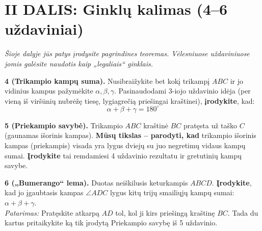 \documentclass[11pt,a4paper]{scrartcl}
\begin{document}
\newpage
\section*{II DALIS: Ginklų kalimas (4–6 uždaviniai)}
\textit{Šioje dalyje jūs patys įrodysite pagrindines teoremas. Vėlesniuose uždaviniuose jomis galėsite naudotis kaip „legaliais“ ginklais.}

\textbf{4 (Trikampio kampų suma).} Nusibraižykite bet kokį trikampį \(ABC\) ir jo vidinius kampus pažymėkite \(\alpha, \beta, \gamma\). Pasinaudodami 3-iojo uždavinio idėja (per vieną iš viršūnių nubrėžę tiesę, lygiagrečią priešingai kraštinei), \textbf{įrodykite}, kad:
\begin{equation*}
\alpha + \beta + \gamma = 180^\circ
\end{equation*}

\vspace{0.5cm}

\textbf{5 (Priekampio savybė).} Trikampio \(ABC\) kraštinė \(BC\) pratęsta už taško \(C\) (gaunamas išorinis kampas). \textbf{Mūsų tikslas – parodyti, kad} trikampio išorinis kampas (priekampis) visada yra lygus dviejų su juo negretimų vidaus kampų sumai. \textbf{Įrodykite} tai remdamiesi 4 uždavinio rezultatu ir gretutinių kampų savybe.

\vspace{0.5cm}

\textbf{6 („Bumerango“ lema).} Duotas neiškilusis keturkampis \(ABCD\). \textbf{Įrodykite}, kad jo įgaubtasis kampas \(\angle ADC\) lygus kitų trijų smailiųjų kampų sumai: \(\alpha + \beta + \gamma\). \\
\textit{Patarimas:} Pratęskite atkarpą \(AD\) tol, kol ji kirs priešingą kraštinę \(BC\). Tada du kartus pritaikykite ką tik įrodytą Priekampio savybę iš 5 uždavinio.
\begin{center}
\end{center}
\end{document}
